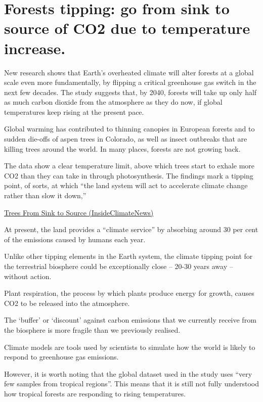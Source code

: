 \documentclass[
]{book}
\begin{document}
\hypertarget{forests-tipping-go-from-sink-to-source-of-co2-due-to-temperature-increase.}{%
\section{Forests tipping: go from sink to source of CO2 due to temperature increase.}\label{forests-tipping-go-from-sink-to-source-of-co2-due-to-temperature-increase.}}

New research shows that Earth's overheated climate will
alter forests at a global scale even more fundamentally,
by flipping a critical greenhouse gas switch in the next few decades.
The study suggests that, by 2040, forests will take up only
half as much carbon dioxide from the atmosphere as they do now,
if global temperatures keep rising at the present pace.

Global warming has contributed to thinning canopies in European forests
and to sudden die-offs of aspen trees in Colorado,
as well as insect outbreaks that are killing trees around the world.
In many places, forests are not growing back.

The data show a clear temperature limit,
above which trees start to exhale more CO2 than they can take in through photosynthesis.
The findings mark a tipping point, of sorts, at which ``the land system will act to accelerate climate change rather than slow it down,''

\href{https://insideclimatenews.org/news/13012021/forests-heat-climate-change/}{Trees From Sink to Source (InsideClimateNews)}

At present, the land provides a ``climate service'' by absorbing
around 30 per cent of the emissions caused by humans each year.

Unlike other tipping elements in the Earth system, the climate tipping point
for the terrestrial biosphere could be exceptionally close --
20-30 years away -- without action.

Plant respiration, the process by which plants produce energy for growth,
causes CO2 to be released into the atmosphere.

The `buffer' or `discount' against carbon emissions that we currently receive from the biosphere is more fragile than we previously realised.

Climate models are tools used by scientists to simulate how the world is likely to respond to greenhouse gas emissions.

However, it is worth noting that the global dataset used in the study
uses ``very few samples from tropical regions''.
This means that it is still not fully understood how tropical forests
are responding to rising temperatures.
\end{document}
